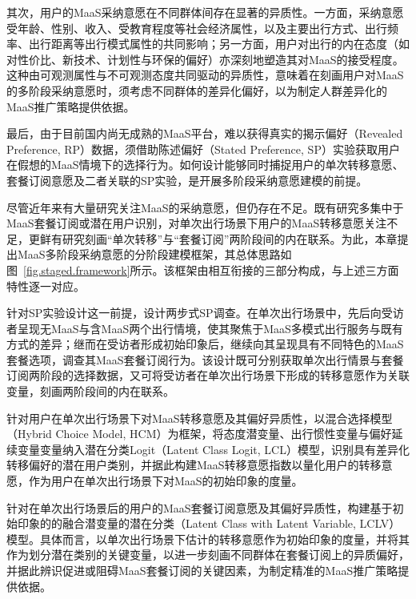 其次，用户的MaaS采纳意愿在不同群体间存在显著的异质性。一方面，采纳意愿受年龄、性别、收入、受教育程度等社会经济属性，以及主要出行方式、出行频率、出行距离等出行模式属性的共同影响\citep{kriswardhanaExploringAspectsMaaS2023,alonso-gonzalezDriversBarriersAdopting2020}；另一方面，用户对出行的内在态度（如对性价比、新技术、计划性与环保的偏好）亦深刻地塑造其对MaaS的接受程度\citep{kimInfluenceLatentLifestyle2022}。这种由可观测属性与不可观测态度共同驱动的异质性，意味着在刻画用户对MaaS的多阶段采纳意愿时，须考虑不同群体的差异化偏好，以为制定人群差异化的MaaS推广策略提供依据。

最后，由于目前国内尚无成熟的MaaS平台，难以获得真实的揭示偏好（Revealed Preference, RP）数据，须借助陈述偏好（Stated Preference, SP）实验获取用户在假想的MaaS情境下的选择行为\citep{kimInfluenceLatentLifestyle2022,matowickiUnderstandingPotentialMaaS2022}。如何设计能够同时捕捉用户的单次转移意愿、套餐订阅意愿及二者关联的SP实验，是开展多阶段采纳意愿建模的前提。

尽管近年来有大量研究关注MaaS的采纳意愿，但仍存在不足。既有研究多集中于MaaS套餐订阅或潜在用户识别\citep{zijlstraEarlyAdoptersMobilityasaService2020,alonso-gonzalezDriversBarriersAdopting2020,matyasInvestigatingHeterogeneityPreferences2021}，对单次出行场景下用户的MaaS转移意愿关注不足，更鲜有研究刻画``单次转移''与``套餐订阅''两阶段间的内在联系。为此，本章提出MaaS多阶段采纳意愿的分阶段建模框架，其总体思路如图~\ref{fig.staged.framework}所示。该框架由相互衔接的三部分构成，与上述三方面特性逐一对应。

针对SP实验设计这一前提，设计两步式SP调查。在单次出行场景中，先后向受访者呈现无MaaS与含MaaS两个出行情境，使其聚焦于MaaS多模式出行服务与既有方式的差异；继而在受访者形成初始印象后，继续向其呈现具有不同特色的MaaS套餐选项，调查其MaaS套餐订阅行为。该设计既可分别获取单次出行情景与套餐订阅两阶段的选择数据，又可将受访者在单次出行场景下形成的转移意愿作为关联变量，刻画两阶段间的内在联系。

针对用户在单次出行场景下对MaaS转移意愿及其偏好异质性，以混合选择模型（Hybrid Choice Model, HCM）为框架，将态度潜变量、出行惯性变量与偏好延续变量变量纳入潜在分类Logit（Latent Class Logit, LCL）模型，识别具有差异化转移偏好的潜在用户类别，并据此构建MaaS转移意愿指数以量化用户的转移意愿，作为用户在单次出行场景下对MaaS的初始印象的度量。

针对在单次出行场景后的用户的MaaS套餐订阅意愿及其偏好异质性，构建基于初始印象的的融合潜变量的潜在分类（Latent Class with Latent Variable, LCLV）模型。具体而言，以单次出行场景下估计的转移意愿作为初始印象的度量，并将其作为划分潜在类别的关键变量，以进一步刻画不同群体在套餐订阅上的异质偏好，并据此辨识促进或阻碍MaaS套餐订阅的关键因素，为制定精准的MaaS推广策略提供依据。

